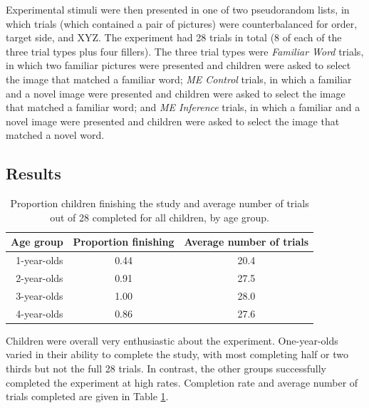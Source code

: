 \documentclass[man,noapacite]{apa2}
\begin{document}
Experimental stimuli were then presented in one of two pseudorandom lists, in which trials (which contained a pair of pictures) were counterbalanced for order, target side, and XYZ. The experiment had 28 trials in total (8 of each of the three trial types plus four fillers). The three trial types were \emph{Familiar Word} trials, in which two familiar pictures were presented and children were asked to select the image that matched a familiar word; \emph{ME Control} trials, in which a familiar and a novel image were presented and children were asked to select the image that matched a familiar word; and \emph{ME Inference} trials, in which a familiar and a novel image were presented and children were asked to select the image that matched a novel word. 

\subsection{Results}


\begin{table}[t]
\centering
\caption{Proportion children finishing the study and average number of trials out of 28 completed for all children, by age group.\label{tab:completion}}

\begin{tabular}{rcc}
  \hline
Age group & Proportion finishing & Average number of trials \\ 
  \hline
1-year-olds & 0.44 & 20.4 \\ 
2-year-olds & 0.91 & 27.5 \\ 
3-year-olds & 1.00 & 28.0 \\ 
4-year-olds & 0.86 & 27.6 \\ 
   \hline
\end{tabular}
\end{table}

Children were overall very enthusiastic about the experiment. One-year-olds varied in their ability to complete the study, with most completing half or two thirds but not the full 28 trials. In contrast, the other groups successfully completed the experiment at high rates. Completion rate and average number of trials completed are given in Table \ref{tab:completion}.
\end{document}
